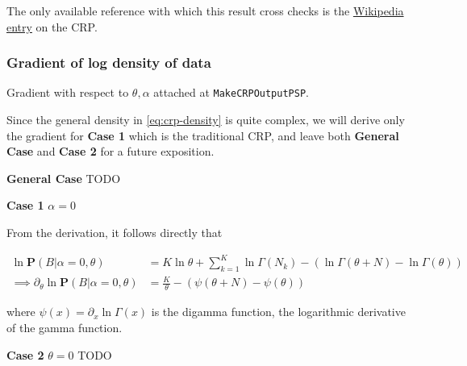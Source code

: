 \documentclass[12pt]{article}
\begin{document}
The only available reference with which this result cross checks is the
\href{https://en.wikipedia.org/wiki/Chinese_restaurant_process#Generalization}
{Wikipedia entry} on the CRP.

\subsubsection{Gradient of log density of data}

Gradient with respect to $\theta, \alpha$ attached at \texttt{MakeCRPOutputPSP}.

Since the general density in \eqref{eq:crp-density} is quite complex, we will derive
only the gradient for \textbf{Case 1} which is the traditional CRP,
and leave both \textbf{General Case} and \textbf{Case 2} for a
future exposition.

\textbf{General Case} TODO

\textbf{Case 1} $\alpha = 0$

From the derivation, it follows directly that

\begin{align*}
\ln\mathbf{P}(B|\alpha=0,\theta)
    & = K\ln\theta + \sum_{k=1}^{K}\ln\Gamma(N_k) -(\ln\Gamma(\theta+N)-\ln\Gamma(\theta))\\
\implies \partial_\theta\ln\mathbf{P}(B|\alpha=0,\theta)
    &= \frac{K}{\theta} - (\psi(\theta+N) - \psi(\theta))
\end{align*}

where $\psi(x) = \partial_x\ln\Gamma(x)$ is the digamma function, the logarithmic
derivative of the gamma function.

\textbf{Case 2} $\theta = 0$ TODO



\end{document}
